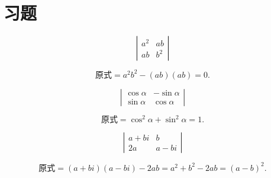 \section{习题}
\begin{frame}
\begin{testexample}
  $$
  \left|
    \begin{array}{rr}
      a^2&ab\\
      ab&b^2
    \end{array}
  \right|
  $$
\end{testexample} \pause 
\begin{jie}
$$
\mbox{原式} = a^2b^2-(ab)(ab) = 0.
$$    
\end{jie}
\end{frame}

\begin{frame}
\begin{testexample}
  $$
  \left|
    \begin{array}{rr}
      \cos \alpha& -\sin \alpha\\
      \sin \alpha&  \cos \alpha
    \end{array}
  \right|
  $$
\end{testexample}\pause

\begin{jie}
$$
\mbox{原式} = \cos^2\alpha + \sin^2 \alpha= 1.
$$    
\end{jie}

\end{frame}

\begin{frame}
\begin{testexample}
  $$
  \left|
    \begin{array}{cc}
      a+bi&b\\
      2a&a-bi
    \end{array}
  \right|
  $$      
\end{testexample}\pause

\begin{jie}
$$
\mbox{原式} = (a+bi)(a-bi)-2ab = a^2+b^2-2ab=(a-b)^2.
$$ 
\end{jie}

\end{frame}

